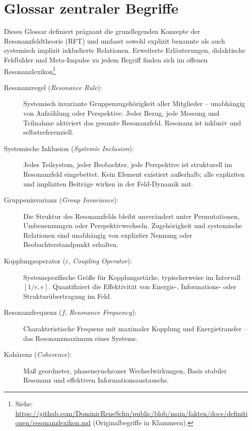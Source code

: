 \documentclass[12pt]{iopart}
\begin{document}
	
\section*{Glossar zentraler Begriffe}

Dieses Glossar definiert prägnant die grundlegenden Konzepte der Resonanzfeldtheorie (RFT) und umfasst sowohl explizit benannte als auch systemisch implizit inkludierte Relationen. Erweiterte Erläuterungen, didaktische Feldbilder und Meta-Impulse zu jedem Begriff finden sich im offenen Resonanzlexikon\footnote{Siehe: \url{https://github.com/DominicReneSchu/public/blob/main/fakten/docs/definitionen/resonanzlexikon.md} (Originalbegriffe in Klammern).}

\begin{description}
	\item[Resonanzregel (\textit{Resonance Rule}):]  
	Systemisch invariante Gruppenzugehörigkeit aller Mitglieder – unabhängig von Aufzählung oder Perspektive. Jeder Bezug, jede Messung und Teilnahme aktiviert das gesamte Resonanzfeld. Resonanz ist inklusiv und selbstreferenziell.
	
	\item[Systemische Inklusion (\textit{Systemic Inclusion}):]  
	Jedes Teilsystem, jeder Beobachter, jede Perspektive ist strukturell im Resonanzfeld eingebettet. Kein Element existiert außerhalb; alle expliziten und impliziten Beiträge wirken in der Feld-Dynamik mit.
	
	\item[Gruppeninvarianz (\textit{Group Invariance}):]  
	Die Struktur des Resonanzfelds bleibt unverändert unter Permutationen, Umbenennungen oder Perspektivwechseln. Zugehörigkeit und systemische Relationen sind unabhängig von expliziter Nennung oder Beobachterstandpunkt erhalten.
	
	\item[Kopplungsoperator ($\varepsilon$, \textit{Coupling Operator}):]  
	Systemspezifische Größe für Kopplungsstärke, typischerweise im Intervall $[1/e, e]$. Quantifiziert die Effektivität von Energie-, Informations- oder Strukturübertragung im Feld.
	
	\item[Resonanzfrequenz ($f$, \textit{Resonance Frequency}):]  
	Charakteristische Frequenz mit maximaler Kopplung und Energietransfer – das Resonanzmaximum eines Systems.
	
	\item[Kohärenz (\textit{Coherence}):]  
	Maß geordneter, phasensynchroner Wechselwirkungen, Basis stabiler Resonanz und effektiven Informationsaustauschs.
	

\end{description}
\end{document}
